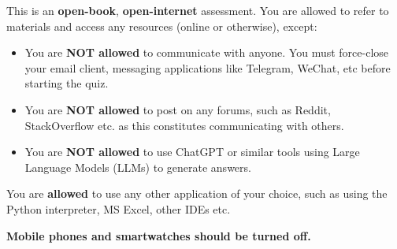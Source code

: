 \documentclass[exam,qn]{yqteach}
\begin{document}
\maketitle


\begin{instructions}
    \item This is an \textbf{open-book}, \textbf{open-internet} assessment. You are allowed to refer to materials and access any resources (online or otherwise), except:
    \begin{itemize}
        \item You are \textbf{NOT allowed} to communicate with anyone. You must force-close your email client, messaging applications like Telegram, WeChat, etc before starting the quiz.
        \item You are \textbf{NOT allowed} to post on any forums, such as Reddit, StackOverflow etc. as this constitutes communicating with others.
        \item You are \textbf{NOT allowed} to use ChatGPT or similar tools using Large Language Models (LLMs) to generate answers.
    \end{itemize}
    \item You are \textbf{allowed} to use any other application of your choice, such as using the Python interpreter, MS Excel, other IDEs etc.
    \item \textbf{Mobile phones and smartwatches should be turned off.}
\end{instructions}

\end{document}
